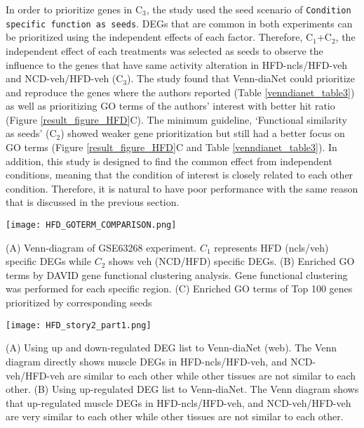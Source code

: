 \documentclass[oneside,phd]{snuthesis}
\begin{document}
In order to prioritize genes in C$_{3}$, the study used the seed scenario of {\tt Condition specific function as seeds}.
DEGs that are common in both experiments can be prioritized using the independent effects of each factor.
Therefore, C$_{1}$+C$_{2}$, the independent effect of each treatments was selected as seeds to observe the influence to the genes that have same activity alteration in HFD-ncls/HFD-veh and NCD-veh/HFD-veh (C$_{3}$).
The study found that Venn-diaNet could prioritize and reproduce the genes where the authors reported (Table \ref{venndianet_table3}) as well as prioritizing GO terms of the authors' interest with better hit ratio (Figure \ref{result_figure_HFD}C). 
The minimum guideline, `Functional similarity as seeds' (C$_{2}$) showed weaker gene prioritization but still had a better focus on GO terms (Figure \ref{result_figure_HFD}C and Table \ref{venndianet_table3}).
In addition, this study is designed to find the common effect from independent conditions, meaning that the condition of interest is closely related to each other condition. 
Therefore, it is natural to have poor performance with the same reason that is discussed in the previous section.
\begin{figure*}
\begin{center}
\texttt{[image: HFD\_GOTERM\_COMPARISON.png]}
\end{center}
\caption{Venn-diaNet HFD GO term Comparison}
\scriptsize{(A) Venn-diagram of GSE63268 experiment. $C_1$ represents HFD (ncls/veh) specific DEGs while $C_2$ shows veh (NCD/HFD) specific DEGs.
(B) Enriched GO terms by DAVID gene functional clustering analysis. Gene functional clustering was performed for each specific region.
(C) Enriched GO terms of Top 100 genes prioritized by corresponding seeds}
\label{result_figure_HFD}
\end{figure*}
\begin{figure*}
\begin{center}
\texttt{[image: HFD\_story2\_part1.png]}
\end{center}
\caption
{Venn-diaNet using 8 different DEG list}
{
\scriptsize{(A) Using up and down-regulated DEG list to Venn-diaNet (web). The Venn diagram directly shows muscle DEGs in HFD-ncls/HFD-veh, and NCD-veh/HFD-veh are similar to each other while other tissues are not similar to each other.
(B) Using up-regulated DEG list to Venn-diaNet. The Venn diagram shows that up-regulated muscle DEGs in HFD-ncls/HFD-veh, and NCD-veh/HFD-veh are very similar to each other while other tissues are not similar to each other.}
}
\label{HFD_story2}
\end{figure*}
\end{document}
